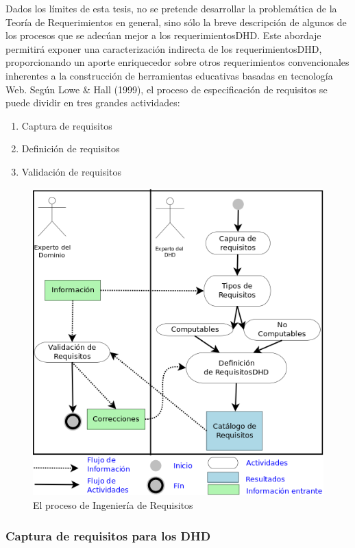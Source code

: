 Dados los límites de esta tesis, no se pretende desarrollar la problemática de la Teoría de
Requerimientos en general, sino sólo la breve descripción de algunos de los
procesos que se adecúan mejor a los requerimientosDHD. Este abordaje
permitirá exponer una caracterización indirecta de los requerimientosDHD,
proporcionando un aporte enriquecedor sobre otros requerimientos convencionales inherentes a la construcción de herramientas educativas basadas en tecnología Web. Según Lowe & Hall (1999), el proceso de especificación de requisitos se puede dividir en tres grandes actividades:

\begin{enumerate}
\item Captura de requisitos
\item Definición de requisitos
\item Validación de requisitos
\end{enumerate}


\begin{figure}
\begin{center}
 \includegraphics[width=4 in,totalheight=3 in] {DHD/ProcesoIngRequisitos}
\caption{El proceso de Ingeniería de Requisitos} \label{fig:Requerimientos}
\end{center}
\end{figure}


\subsubsection{Captura de requisitos para los DHD}

